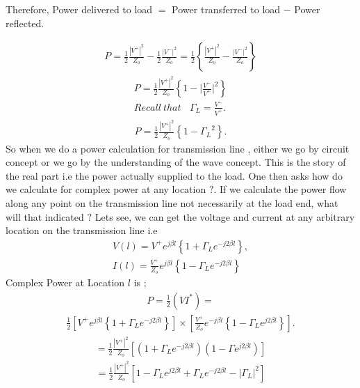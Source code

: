 Therefore, Power delivered to load $=$ Power transferred to load $-$ Power reflected.

\begin{align*} 
P= \frac{1}{2} \frac{ { |V^+ | }^2}{Z_o} -\frac{1}{2} \frac{ {|V^- |}^2 }{Z_o} = \frac{1}{2} \left\lbrace \frac{ { | V^+ | }^2}{Z_o} -\frac{ {|V^- |}^2 }{Z_o} \right\rbrace
\end{align*}
\begin{align*} 
P= \frac{1}{2} \frac{ { | V^+ | } ^2}{Z_o} \left\lbrace 1 - { | {\frac{V^-}{V^+}|^2}}\right\rbrace\\
Recall \ that\ \ \ \  \Gamma_L =\frac{V^-}{V^+}.
\end{align*}
\begin{align*}
P=\frac{1}{2} \frac{{| V^+ |}^2}{Z_o} \left\lbrace 1 - { \Gamma_L }^2 \right\rbrace.
\end{align*}
So when we do a power calculation for transmission line , either we go by circuit concept or we go by the understanding of the wave concept. This is the story of the real part i.e the power actually supplied to the load. One then asks how do we calculate for complex power at any location $?$. If we calculate the power flow along any point on the transmission line not necessarily at the load end, what will that indicated $?$ Lets see, we can get the voltage and current at any arbitrary location on the transmission line i.e
\begin{align*} 
V(l) = V^+ e^{j\beta l} \left\lbrace 1 + \Gamma_L e^{-j2\beta l} \right\rbrace ,\\ 
I(l) = \frac{V^+}{Z_o} e^{j\beta l} \left\lbrace 1 - \Gamma_L e^{-j2\beta l} \right\rbrace
\end{align*}
Complex Power at Location $l$ is ;
\begin{align*}
P = \frac{1}{2} (V I^*) =
\end{align*}
\begin{align*}
\frac{1}{2} [V^+ e^{j\beta l} \left\lbrace 1 + \Gamma_L e^{-j2\beta l} \right\rbrace ] \times [\frac{V^+}{Z_o} e^{-j\beta l} \left\lbrace 1 - \Gamma_L e^{j2\beta l} \right\rbrace].
\end{align*}
\begin{align*}
=\frac{1}{2} \frac{{| V ^+ |}^2}{Z_o} [( 1 + \Gamma_L e^{-j2\beta l})(1 - \Gamma e^{j2\beta l})]
\end{align*}
\begin{align*}
= \frac{1}{2} \frac{{ | V^+ | }^2}{Z_o} [ 1 - \Gamma_L e^{j2\beta l} + \Gamma_L e^ {-j2\beta l} - {| \Gamma_L | ^2}]
\end{align*}
